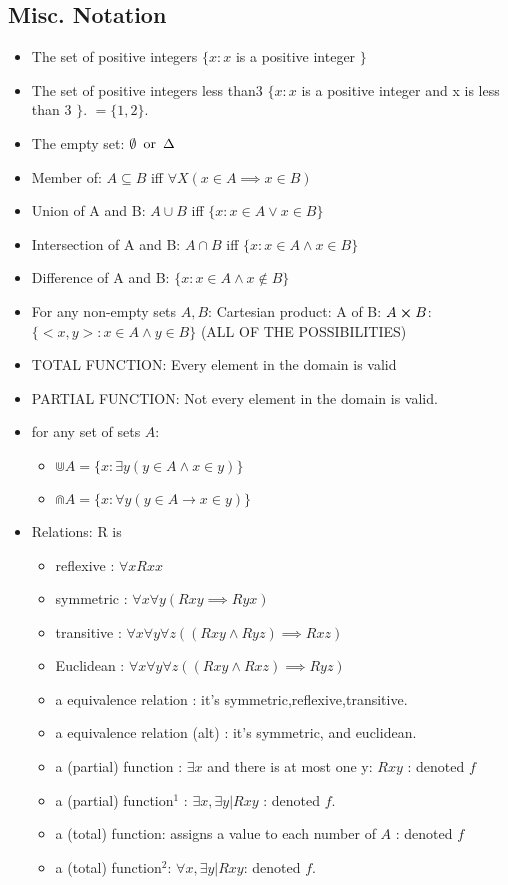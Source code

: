 
\subsection{Misc. Notation}

\begin{itemize}
\item The set of positive integers $\{ x : x$ is a positive integer $\}$ 
\item The set of positive integers less than3 $\{ x : x $ is a positive integer and x is less than 3 $\}$. $= \{1,2\}$. 
\item The empty set: $\emptyset \operatorname{\text{ or }} \Delta$ 
\item Member of: $A \subseteq B$ iff $\forall X (x \in A \implies x \in B )$ 
\item Union of A and B: $A \cup B $ iff $\{ x : x \in A \lor x \in B \}$
\item Intersection of A and B: $A \cap B $ iff $\{ x : x \in A \land x \in B \}$
\item Difference of A and B: $\{ x : x \in A \land x \not \in B \}$
\item For any non-empty sets $A,B$:
Cartesian product: A of B: $A \cross B$: $\{<x,y>: x \in A \land y \in B \}$ (ALL OF THE POSSIBILITIES)
\item TOTAL FUNCTION: Every element in the domain is valid
\item PARTIAL FUNCTION: Not every element in the domain is valid.
\item for any set of sets $A$:
\begin{itemize}
\item $\Cup A = \{ x : \exists y ( y \in A \land x \in y ) \}$ 
\item $\Cap A = \{ x : \forall y (y \in A \to x \in y )\}$ 
\end{itemize}
\item Relations: R is 
\begin{itemize}
\item reflexive : $\forall x Rxx$
\item symmetric : $\forall x \forall y (Rxy \implies Ryx)$
\item transitive : $\forall x \forall y \forall z ((Rxy \land Ryz) \implies Rxz)$
\item Euclidean : $\forall x \forall y \forall z ((Rxy \land Rxz ) \implies Ryz)$
\item a equivalence relation : it's symmetric,reflexive,transitive.
\item a equivalence relation (alt) : it's symmetric, and euclidean.
\item a (partial) function : $\exists x$ and there is at most one y: $Rxy$ : denoted $f$
\item a (partial) function$^{1}$ :  $\exists x , \exists y | Rxy$ : denoted $f$.
\item a (total) function: assigns a value to each number of $A$ : denoted $f$
\item a (total) function$^{2}$: $\forall x , \exists y | Rxy$: denoted $f$.


\end{itemize}
\end{itemize}
